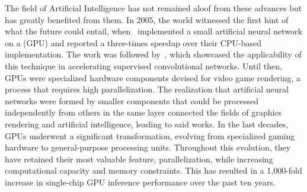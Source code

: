 The field of Artificial Intelligence has not remained aloof from these advances but has greatly benefited from them. In 2005, the world witnessed the first hint of what the future could entail, when~ implemented a small artificial neural network on a  (GPU) and reported a three-times speedup over their CPU-based implementation. The work was followed by~, which showcased the applicability of this technique in accelerating supervised convolutional networks. Until then, GPUs were specialized hardware components devised for video game rendering, a process that requires high parallelization. The realization that artificial neural networks were formed by smaller components that could be processed independently from others in the same layer connected the fields of graphics rendering and artificial intelligence, leading to said works. In the last decades, GPUs underwent a significant transformation, evolving from specialized gaming hardware to general-purpose processing units. Throughout this evolution, they have retained their most valuable feature, parallelization, while increasing computational capacity and memory constraints. This has resulted in a 1,000-fold increase in single-chip GPU inference performance over the past ten years.



